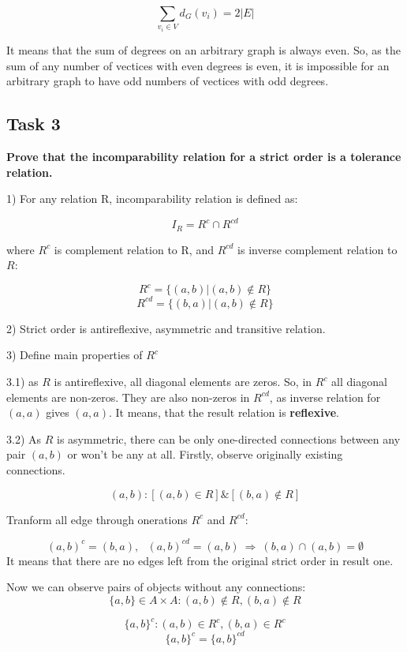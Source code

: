 \[ \sum_{v_i \in V} d_G(v_i) = 2 |E|  \]

It means that the sum of degrees on an arbitrary graph is always even.
So, as the sum of any number of vectices with even degrees is even, it is impossible for an arbitrary graph to have odd numbers of vectices with odd degrees.

\subsection{Task 3}

\begin{center}
\textbf{Prove that the incomparability relation for a strict order is a tolerance relation.}
\end{center}

1) For any relation R, incomparability relation is defined as: 

\[ I_R = R^{c} \cap R^{cd} \]

where $R^c$ is complement relation to R, and $R^{cd}$ is inverse complement relation to $R$:

\[ R^{c} = \{ (a,b) | (a,b) \notin R \} \]
\[ R^{cd} = \{ (b,a) | (a,b) \notin R \} \]

2) Strict order is antireflexive, asymmetric and transitive relation.

3) Define main properties of $R^{c}$

3.1) as $R$ is antireflexive, all diagonal elements are zeros.
So, in $R^{c}$ all diagonal elements are non-zeros. They are also non-zeros in $R^{cd}$, as inverse relation for $(a,a)$ gives $(a,a)$. It means, that the result relation is \textbf{reflexive}.

3.2) As $R$ is asymmetric, there can be only one-directed connections between any pair $(a,b)$ or won't be any at all.
Firstly, observe originally existing connections.

\[ (a,b): [(a,b) \in R] \& [(b,a) \notin R] \]

Tranform all edge through onerations $R^{c}$ and $R^{cd}$:

\[ (a,b)^{c} = (b,a),\ \ \ (a,b)^{cd} = (a,b) \ \Rightarrow \ (b,a) \cap (a,b) = \emptyset \]
It means that there are no edges left from the original strict order in result one.

Now we can observe pairs of objects without any connections:
\[ \{a,b\} \in A \times A: (a,b) \notin R, (b,a) \notin R \]

\[ \{a,b\}^{c}: (a,b) \in R^{c}, (b,a) \in R^{c} \]
\[ \{a,b\}^{c} = \{a,b\}^{cd} \]


